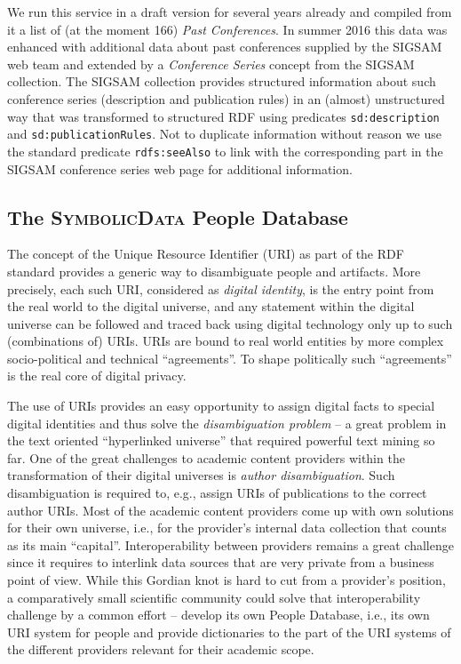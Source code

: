 \documentclass[a4paper,11pt]{article}
\def\SD{\textsc{SymbolicData}}
\begin{document}
We run this service in a draft version  for several years already and compiled
from it a list of (at the moment 166) \emph{Past Conferences}. In summer 2016
this data was enhanced with additional data about past conferences supplied by
the SIGSAM web team and extended by a \emph{Conference Series} concept from the
SIGSAM collection.  The SIGSAM collection provides structured information about
such conference series (description and publication rules) in an (almost)
unstructured way that was transformed to structured RDF using predicates
\texttt{sd:description} and \texttt{sd:publicationRules}.  Not to duplicate
information without reason we use the standard predicate \texttt{rdfs:seeAlso}
to link with the corresponding part in the SIGSAM conference series web page
for additional information.

\subsection{The {\SD} People Database}

The concept of the Unique Resource Identifier (URI) as part of the RDF standard
provides a generic way to disambiguate people and artifacts.  More precisely,
each such URI, considered as \emph{digital identity}, is the entry point from
the real world to the digital universe, and any statement within the digital
universe can be followed and traced back using digital technology only up to
such (combinations of) URIs. URIs are bound to real world entities by more
complex socio-political and technical ``agreements''. To shape politically such
``agreements'' is the real core of digital privacy.

The use of URIs provides an easy opportunity to assign digital facts to special
digital identities and thus solve the \emph{disambiguation problem} -- a great
problem in the text oriented ``hyperlinked universe'' that required powerful
text mining so far.  One of the great challenges to academic content providers
within the transformation of their digital universes is \emph{author
  disambiguation}. Such disambiguation is required to, e.g., assign URIs of
publications to the correct author URIs.  Most of the academic content
providers come up with own solutions for their own universe, i.e., for the
provider's internal data collection that counts as its main ``capital''.
Interoperability between providers remains a great challenge since it requires
to interlink data sources that are very private from a business point of view.
While this Gordian knot is hard to cut from a provider's position, a
comparatively small scientific community could solve that interoperability
challenge by a common effort -- develop its own People Database, i.e., its own
URI system for people and provide dictionaries to the part of the URI systems
of the different providers relevant for their academic scope.
\end{document}
